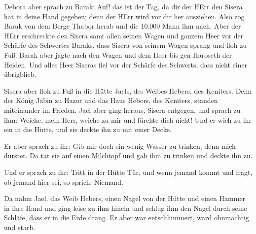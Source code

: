  Debora aber sprach zu Barak: Auf! das ist der Tag, da dir
der HErr den Sisera hat in deine Hand gegeben; denn der HErr wird vor
dir her ausziehen. Also zog Barak von dem Berge Thabor herab und die
10.000 Mann ihm nach.  Aber der HErr erschreckte den Sisera
samt allen seinen Wagen und ganzem Heer vor der Schärfe des Schwertes
Baraks, dass Sisera von seinem Wagen sprang und floh zu Fuß.
 Barak aber jagte nach den Wagen und dem Heer bis gen
Haroseth der Heiden. Und alles Heer Siseras fiel vor der Schärfe des
Schwerts, dass nicht einer übrigblieb.

 Sisera aber floh zu Fuß in die Hütte Jaels, des Weibes
Hebers, des Keniters. Denn der König Jabin zu Hazor und das Haus Hebers,
des Keniters, standen miteinander im Frieden.  Jael aber
ging heraus, Sisera entgegen, und sprach zu ihm: Weiche, mein Herr,
weiche zu mir und fürchte dich nicht! Und er wich zu ihr ein in die
Hütte, und sie deckte ihn zu mit einer Decke.

 Er aber sprach zu ihr: Gib mir doch ein wenig Wasser zu
trinken, denn mich dürstet. Da tat sie auf einen Milchtopf und gab ihm
zu trinken und deckte ihn zu.

 Und er sprach zu ihr: Tritt in der Hütte Tür, und wenn
jemand kommt und fragt, ob jemand hier sei, so sprich: Niemand.

 Da nahm Jael, das Weib Hebers, einen Nagel von der Hütte
und einen Hammer in ihre Hand und ging leise zu ihm hinein und schlug
ihm den Nagel durch seine Schläfe, dass er in die Erde drang. Er aber
war entschlummert, ward ohnmächtig und starb.

